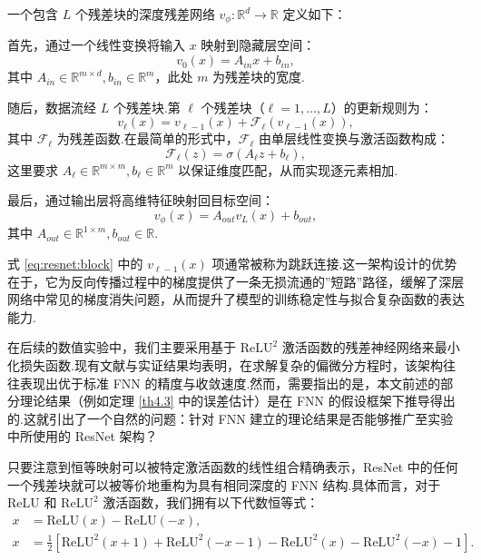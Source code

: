\begin{definition}[残差神经网络]
一个包含 $L$ 个残差块的深度残差网络 $v_{\phi}: \mathbb{R}^{d} \to \mathbb{R}$ 定义如下：

首先，通过一个线性变换将输入 $x$ 映射到隐藏层空间：
\begin{equation}
v_{0}(x) = A_{in} x + b_{in},
\end{equation}
其中 $A_{in} \in \mathbb{R}^{m \times d}, b_{in} \in \mathbb{R}^{m}$，此处 $m$ 为残差块的宽度.

随后，数据流经 $L$ 个残差块.第 $\ell$ 个残差块（$\ell=1, \dots, L$）的更新规则为：
\begin{equation}\label{eq:resnet:block}
v_{\ell}(x) = v_{\ell-1}(x) + \mathcal{F}_{\ell}(v_{\ell-1}(x)),
\end{equation}
其中 $\mathcal{F}_{\ell}$ 为残差函数.在最简单的形式中，$\mathcal{F}_{\ell}$ 由单层线性变换与激活函数构成：
\begin{equation}
\mathcal{F}_{\ell}(z) = \sigma\left(A_{\ell} z + b_{\ell}\right),
\end{equation}
这里要求 $A_{\ell} \in \mathbb{R}^{m \times m}, b_{\ell} \in \mathbb{R}^{m}$ 以保证维度匹配，从而实现逐元素相加.

最后，通过输出层将高维特征映射回目标空间：
\begin{equation}
v_{\phi}(x) = A_{out} v_{L}(x) + b_{out},
\end{equation}
其中 $A_{out} \in \mathbb{R}^{1 \times m}, b_{out} \in \mathbb{R}$.
\end{definition}

式 \eqref{eq:resnet:block} 中的 $v_{\ell-1}(x)$ 项通常被称为跳跃连接.这一架构设计的优势在于，它为反向传播过程中的梯度提供了一条无损流通的”短路”路径，缓解了深层网络中常见的梯度消失问题，从而提升了模型的训练稳定性与拟合复杂函数的表达能力.

在后续的数值实验中，我们主要采用基于 $\mathrm{ReLU}^{2}$ 激活函数的残差神经网络来最小化损失函数.现有文献与实证结果均表明，在求解复杂的偏微分方程时，该架构往往表现出优于标准 FNN 的精度与收敛速度.然而，需要指出的是，本文前述的部分理论结果（例如定理 \ref{th4.3} 中的误差估计）是在 FNN 的假设框架下推导得出的.这就引出了一个自然的问题：针对 FNN 建立的理论结果是否能够推广至实验中所使用的 ResNet 架构？

只要注意到恒等映射可以被特定激活函数的线性组合精确表示，ResNet 中的任何一个残差块就可以被等价地重构为具有相同深度的 FNN 结构.具体而言，对于 $\mathrm{ReLU}$ 和 $\mathrm{ReLU}^{2}$ 激活函数，我们拥有以下代数恒等式：
\begin{align}
x &= \mathrm{ReLU}(x) - \mathrm{ReLU}(-x), \\
x &= \frac{1}{2}\left[\mathrm{ReLU}^{2}(x+1) + \mathrm{ReLU}^{2}(-x-1) - \mathrm{ReLU}^{2}(x) - \mathrm{ReLU}^{2}(-x) - 1\right]. \label{eq:relu2_identity}
\end{align}


